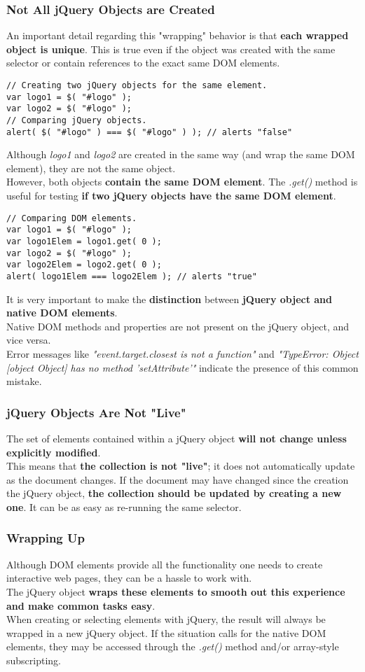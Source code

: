 \documentclass[10pt,letterpaper]{report}
\begin{document}
\subsubsection{Not All jQuery Objects are Created}
An important detail regarding this "wrapping" behavior is that \textbf{each wrapped object is unique}. This is true even if the object was created with the same selector or contain references to the exact same DOM elements.
\begin{lstlisting}
// Creating two jQuery objects for the same element.
var logo1 = $( "#logo" );
var logo2 = $( "#logo" );
// Comparing jQuery objects.
alert( $( "#logo" ) === $( "#logo" ) ); // alerts "false"
\end{lstlisting}
Although \textit{logo1} and \textit{logo2} are created in the same way (and wrap the same DOM element), they are not the same object.\\
However, both objects \textbf{contain the same DOM element}. The \textit{.get()} method is useful for testing \textbf{if two jQuery objects have the same DOM element}.
\begin{lstlisting}
// Comparing DOM elements.
var logo1 = $( "#logo" );
var logo1Elem = logo1.get( 0 );
var logo2 = $( "#logo" );
var logo2Elem = logo2.get( 0 );
alert( logo1Elem === logo2Elem ); // alerts "true"
\end{lstlisting}
It is very important to make the \textbf{distinction} between \textbf{jQuery object and native DOM elements}.\\
Native DOM methods and properties are not present on the jQuery object, and vice versa.\\
Error messages like \textit{"event.target.closest is not a function"} and \textit{"TypeError: Object [object Object] has no method 'setAttribute'"} indicate the presence of this common mistake.
\subsubsection{jQuery Objects Are Not "Live"}
The set of elements contained within a jQuery object \textbf{will not change unless explicitly modified}.\\
This means that \textbf{the collection is not "live"}; it does not automatically update as the document changes. If the document may have changed since the creation the jQuery object, \textbf{the collection should be updated by creating a new one}. It can be as easy as re-running the same selector.
\subsubsection{Wrapping Up}
Although DOM elements provide all the functionality one needs to create interactive web pages, they can be a hassle to work with.\\
The jQuery object \textbf{wraps these elements to smooth out this experience and make common tasks easy}.\\
When creating or selecting elements with jQuery, the result will always be wrapped in a new jQuery object. If the situation calls for the native DOM elements, they may be accessed through the \textit{.get()} method and/or array-style subscripting.
\end{document}
